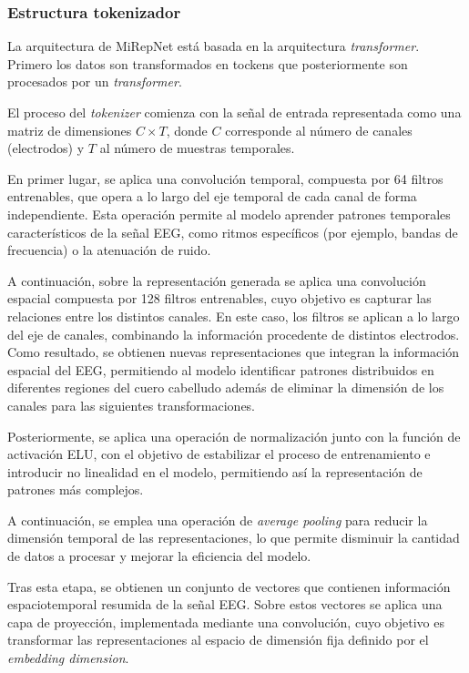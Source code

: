 \subsubsection{Estructura tokenizador}
\label{subsubsec:arquitecturaTockenizador}

La arquitectura de MiRepNet está basada en la arquitectura \textit{transformer}. Primero los datos son transformados en tockens que posteriormente son procesados por un \textit{transformer}. 

El proceso del \textit{tokenizer} comienza con la señal de entrada representada como una matriz de dimensiones $C \times T$, donde $C$ corresponde al número de canales (electrodos) y $T$ al número de muestras temporales.

En primer lugar, se aplica una convolución temporal, compuesta por 64 filtros entrenables, que opera a lo largo del eje temporal de cada canal de forma independiente. Esta operación permite al modelo aprender patrones temporales característicos de la señal EEG, como ritmos específicos (por ejemplo, bandas de frecuencia) o la atenuación de ruido.

A continuación, sobre la representación generada se aplica una convolución espacial compuesta por 128 filtros entrenables, cuyo objetivo es capturar las relaciones entre los distintos canales. En este caso, los filtros se aplican a lo largo del eje de canales, combinando la información procedente de distintos electrodos. Como resultado, se obtienen nuevas representaciones que integran la información espacial del EEG, permitiendo al modelo identificar patrones distribuidos en diferentes regiones del cuero cabelludo además de eliminar la dimensión de los canales para las siguientes transformaciones.

Posteriormente, se aplica una operación de normalización junto con la función de activación ELU, con el objetivo de estabilizar el proceso de entrenamiento e introducir no linealidad en el modelo, permitiendo así la representación de patrones más complejos.

A continuación, se emplea una operación de \textit{average pooling} para reducir la dimensión temporal de las representaciones, lo que permite disminuir la cantidad de datos a procesar y mejorar la eficiencia del modelo.

Tras esta etapa, se obtienen un conjunto de vectores que contienen información espaciotemporal resumida de la señal EEG. Sobre estos vectores se aplica una capa de proyección, implementada mediante una convolución, cuyo objetivo es transformar las representaciones al espacio de dimensión fija definido por el \textit{embedding dimension}.

